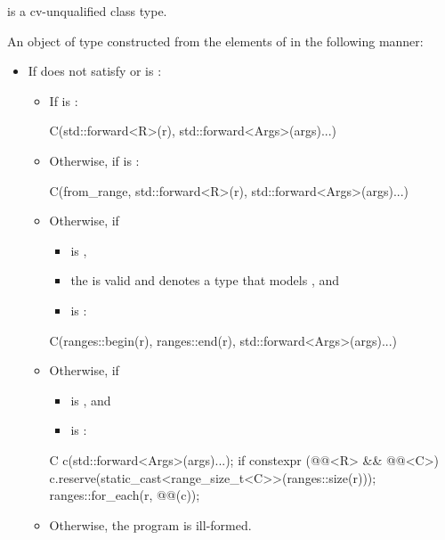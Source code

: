 \begin{itemdescr}
\pnum
\mandates
{} is a cv-unqualified class type.

\pnum
\returns
An object of type 
constructed from the elements of  in the following manner:
\begin{itemize}
\item
If  does not satisfy  or
is :
\begin{itemize}
\item
If  is :
\begin{codeblock}
C(std::forward<R>(r), std::forward<Args>(args)...)
\end{codeblock}
\item
Otherwise, if
is :
\begin{codeblock}
C(from_range, std::forward<R>(r), std::forward<Args>(args)...)
\end{codeblock}
\item
Otherwise, if
\begin{itemize}
\item
{} is ,
\item
the 
is valid and denotes a type that models
, and
\item
{}
is :
\end{itemize}
\begin{codeblock}
C(ranges::begin(r), ranges::end(r), std::forward<Args>(args)...)
\end{codeblock}
\item
Otherwise, if
\begin{itemize}
\item
{} is , and
\item
{} is :
\end{itemize}
\begin{codeblock}
C c(std::forward<Args>(args)...);
if constexpr (@@<R> && @@<C>)
  c.reserve(static_cast<range_size_t<C>>(ranges::size(r)));
ranges::for_each(r, @@(c));
\end{codeblock}
\item
Otherwise, the program is ill-formed.
\end{itemize}


\end{itemize}
\end{itemdescr}
